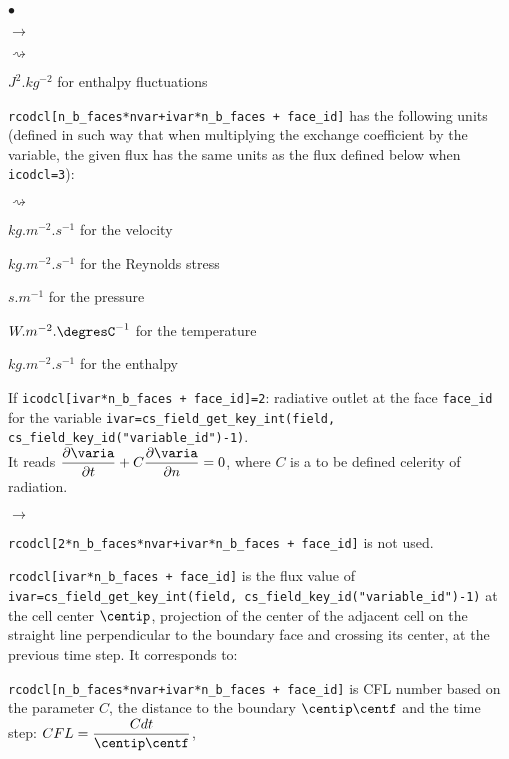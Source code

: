 \begin{list}{$\bullet$}{}
\begin{list}{$\rightarrow$}{}
\begin{list}{$\rightsquigarrow$}{}
\item $J^2.kg^{-2}$ for enthalpy fluctuations
\end{list}

\item \texttt{rcodcl[n\_b\_faces*nvar+ivar*n\_b\_faces + face\_id]} has the following units (defined in such way
      that when multiplying the exchange coefficient by the variable, the
      given flux has the same units as the flux defined below when
      \texttt{icodcl=3}):

\begin{list}{$\rightsquigarrow$}{}
\item $kg.m^{-2}.s^{-1}$ for the velocity

\item $kg.m^{-2}.s^{-1}$ for the Reynolds stress

\item $s.m^{-1}$ for the pressure

\item $W.m^{-2}.\mbox{\degresC}^{-1}$ for the temperature

\item $kg.m^{-2}.s^{-1}$ for the enthalpy
\end{list}

\end{list}

\item If \texttt{icodcl[ivar*n\_b\_faces + face\_id]=2}: radiative outlet at the face \texttt{face\_id}
      for the variable \texttt{ivar=cs\_field\_get\_key\_int(field,
       cs\_field\_key\_id("variable\_id")-1)}. \\
        It reads $ \dfrac{\partial \varia }{\partial t} + C \dfrac{\partial \varia}{\partial n} = 0 $,
        where $C$ is a to be defined celerity of radiation.

\begin{list}{$\rightarrow$}{}
\item \texttt{rcodcl[2*n\_b\_faces*nvar+ivar*n\_b\_faces + face\_id]} is not used.

\item \texttt{rcodcl[ivar*n\_b\_faces + face\_id]} is the flux value of \texttt{ivar=cs\_field\_get\_key\_int(field,
      cs\_field\_key\_id("variable\_id")-1)} at the cell center $\centip$,
      projection of the center of the adjacent cell on the straight line
      perpendicular to the boundary face and crossing its center,
      at the previous time step.
      It corresponds to:
\item \texttt{rcodcl[n\_b\_faces*nvar+ivar*n\_b\_faces + face\_id]} is CFL number based on the parameter $C$,
      the distance to the boundary $\centip \centf$ and the time step:
      $CFL = \dfrac{C dt }{\centip \centf}$,


\end{list}
\end{list}
